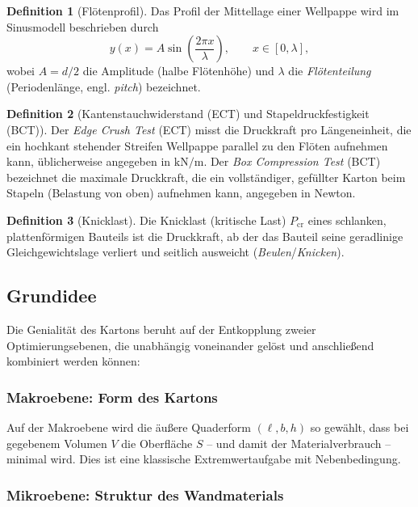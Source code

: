 ﻿\documentclass[a4paper,12pt]{article}
\theoremstyle{definition}
\newtheorem{definition}{Definition}
\begin{document}
\begin{definition}[Flötenprofil]
	\label{def:flute}
	Das Profil der Mittellage einer Wellpappe wird im Sinusmodell beschrieben
	durch
	\[
		y(x) = A \sin\!\left(\frac{2\pi x}{\lambda}\right), \qquad x \in [0,\lambda],
	\]
	wobei $A = d/2$ die Amplitude (halbe Flötenhöhe) und $\lambda$ die
	\emph{Flötenteilung} (Periodenlänge, engl. \emph{pitch}) bezeichnet.
\end{definition}

\begin{definition}[Kantenstauchwiderstand (ECT) und Stapeldruckfestigkeit (BCT)]
	Der \emph{Edge Crush Test} (ECT) misst die Druckkraft pro Längeneinheit, die
	ein hochkant stehender Streifen Wellpappe parallel zu den Flöten aufnehmen
	kann, üblicherweise angegeben in $\mathrm{kN/m}$. Der \emph{Box Compression
	Test} (BCT) bezeichnet die maximale Druckkraft, die ein vollständiger,
	gefüllter Karton beim Stapeln (Belastung von oben) aufnehmen kann, angegeben
	in Newton.
\end{definition}

\begin{definition}[Knicklast]
	Die Knicklast (kritische Last) $P_{\mathrm{cr}}$ eines schlanken,
	plattenförmigen Bauteils ist die Druckkraft, ab der das Bauteil seine
	geradlinige Gleichgewichtslage verliert und seitlich ausweicht
	(\emph{Beulen}/\emph{Knicken}).
\end{definition}

\subsection{Grundidee}

Die Genialität des Kartons beruht auf der Entkopplung zweier Optimierungsebenen, die
unabhängig voneinander gelöst und anschließend kombiniert werden können:

\subsubsection{Makroebene: Form des Kartons}

Auf der Makroebene wird die äußere Quaderform $(\ell, b, h)$ so gewählt, dass bei
gegebenem Volumen $V$ die Oberfläche $S$ -- und damit der Materialverbrauch -- minimal
wird. Dies ist eine klassische Extremwertaufgabe mit Nebenbedingung.

\subsubsection{Mikroebene: Struktur des Wandmaterials}
\end{document}

